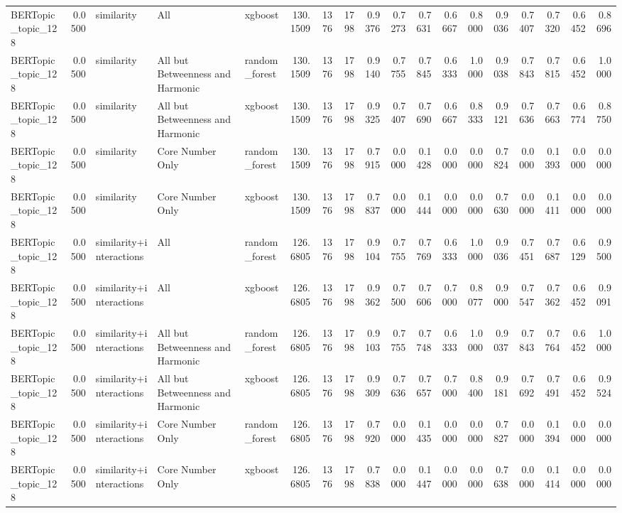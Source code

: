 \begin{tabular}{lrlllrrrrrrrrrrrrr}
BERTopic_topic_128 & 0.0500 & similarity & All & xgboost & 130.1509 & 1376 & 1798 & 0.9376 & 0.7273 & 0.7631 & 0.6667 & 0.8000 & 0.9036 & 0.7407 & 0.7320 & 0.6452 & 0.8696 \\
BERTopic_topic_128 & 0.0500 & similarity & All but Betweenness and Harmonic & random_forest & 130.1509 & 1376 & 1798 & 0.9140 & 0.7755 & 0.7845 & 0.6333 & 1.0000 & 0.9038 & 0.7843 & 0.7815 & 0.6452 & 1.0000 \\
BERTopic_topic_128 & 0.0500 & similarity & All but Betweenness and Harmonic & xgboost & 130.1509 & 1376 & 1798 & 0.9325 & 0.7407 & 0.7690 & 0.6667 & 0.8333 & 0.9121 & 0.7636 & 0.7663 & 0.6774 & 0.8750 \\
BERTopic_topic_128 & 0.0500 & similarity & Core Number Only & random_forest & 130.1509 & 1376 & 1798 & 0.7915 & 0.0000 & 0.1428 & 0.0000 & 0.0000 & 0.7824 & 0.0000 & 0.1393 & 0.0000 & 0.0000 \\
BERTopic_topic_128 & 0.0500 & similarity & Core Number Only & xgboost & 130.1509 & 1376 & 1798 & 0.7837 & 0.0000 & 0.1444 & 0.0000 & 0.0000 & 0.7630 & 0.0000 & 0.1411 & 0.0000 & 0.0000 \\
BERTopic_topic_128 & 0.0500 & similarity+interactions & All & random_forest & 126.6805 & 1376 & 1798 & 0.9104 & 0.7755 & 0.7769 & 0.6333 & 1.0000 & 0.9036 & 0.7451 & 0.7687 & 0.6129 & 0.9500 \\
BERTopic_topic_128 & 0.0500 & similarity+interactions & All & xgboost & 126.6805 & 1376 & 1798 & 0.9362 & 0.7500 & 0.7606 & 0.7000 & 0.8077 & 0.9000 & 0.7547 & 0.7362 & 0.6452 & 0.9091 \\
BERTopic_topic_128 & 0.0500 & similarity+interactions & All but Betweenness and Harmonic & random_forest & 126.6805 & 1376 & 1798 & 0.9103 & 0.7755 & 0.7748 & 0.6333 & 1.0000 & 0.9037 & 0.7843 & 0.7764 & 0.6452 & 1.0000 \\
BERTopic_topic_128 & 0.0500 & similarity+interactions & All but Betweenness and Harmonic & xgboost & 126.6805 & 1376 & 1798 & 0.9309 & 0.7636 & 0.7657 & 0.7000 & 0.8400 & 0.9181 & 0.7692 & 0.7491 & 0.6452 & 0.9524 \\
BERTopic_topic_128 & 0.0500 & similarity+interactions & Core Number Only & random_forest & 126.6805 & 1376 & 1798 & 0.7920 & 0.0000 & 0.1435 & 0.0000 & 0.0000 & 0.7827 & 0.0000 & 0.1394 & 0.0000 & 0.0000 \\
BERTopic_topic_128 & 0.0500 & similarity+interactions & Core Number Only & xgboost & 126.6805 & 1376 & 1798 & 0.7838 & 0.0000 & 0.1447 & 0.0000 & 0.0000 & 0.7638 & 0.0000 & 0.1414 & 0.0000 & 0.0000 \\

\end{tabular}

